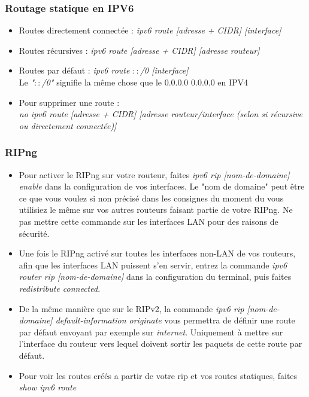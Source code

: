 \documentclass[a4paper]{article}
\begin{document}
\subsubsection{Routage statique en IPV6}
\begin{itemize}  
  \item Routes directement connectée : \emph{ipv6 route [adresse + CIDR] [interface]}
  \item Routes récursives : \emph{ipv6 route [adresse + CIDR] [adresse routeur]}
  \item Routes par défaut : \emph{ipv6 route $::$/0 [interface]}\\
  Le \emph{"$::$/0"} signifie la même chose que le 0.0.0.0 0.0.0.0 en IPV4
  \item Pour supprimer une route :\\ \emph{no ipv6 route [adresse + CIDR] [adresse routeur/interface (selon si récursive ou directement connectée)]}
\end{itemize}
\subsubsection{RIPng}
\begin{itemize}
  \item Pour activer le RIPng sur votre routeur, faites \emph{ipv6 rip [nom-de-domaine] enable} dans la configuration de vos interfaces. Le "nom de domaine" peut être ce que vous voulez si non précisé dans les consignes du moment du vous utilisiez
  le même sur vos autres routeurs faisant partie de votre RIPng. Ne pas mettre cette commande sur les interfaces LAN pour des raisons de sécurité.
  \item Une fois le RIPng activé sur toutes les interfaces non-LAN de vos routeurs, afin que les interfaces LAN puissent s'en servir, entrez la commande \emph{ipv6 router rip [nom-de-domaine]} dans la configuration du terminal,
  puis faites \emph{redistribute connected}.
  \item De la même manière que sur le RIPv2, la commande \emph{ipv6 rip [nom-de-domaine] default-information originate} vous permettra de définir une route par défaut envoyant par exemple sur \emph{internet}. 
  Uniquement à mettre sur l'interface du routeur vers lequel doivent sortir les paquets de cette route par défaut.
  \item Pour voir les routes créés a partir de votre rip et vos routes statiques, faites \emph{show ipv6 route}
\end{itemize}
\end{document}
